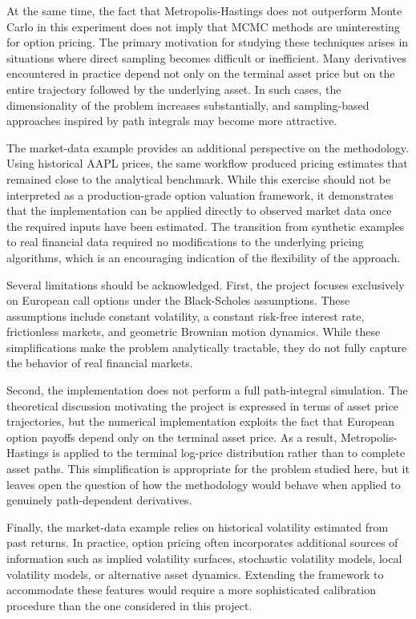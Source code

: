 \documentclass[
  12pt,
  letterpaper,
]{book}
\begin{document}
At the same time, the fact that Metropolis-Hastings does not outperform
Monte Carlo in this experiment does not imply that MCMC methods are
uninteresting for option pricing. The primary motivation for studying
these techniques arises in situations where direct sampling becomes
difficult or inefficient. Many derivatives encountered in practice
depend not only on the terminal asset price but on the entire trajectory
followed by the underlying asset. In such cases, the dimensionality of
the problem increases substantially, and sampling-based approaches
inspired by path integrals may become more attractive.

The market-data example provides an additional perspective on the
methodology. Using historical AAPL prices, the same workflow produced
pricing estimates that remained close to the analytical benchmark. While
this exercise should not be interpreted as a production-grade option
valuation framework, it demonstrates that the implementation can be
applied directly to observed market data once the required inputs have
been estimated. The transition from synthetic examples to real financial
data required no modifications to the underlying pricing algorithms,
which is an encouraging indication of the flexibility of the approach.

Several limitations should be acknowledged. First, the project focuses
exclusively on European call options under the Black-Scholes
assumptions. These assumptions include constant volatility, a constant
risk-free interest rate, frictionless markets, and geometric Brownian
motion dynamics. While these simplifications make the problem
analytically tractable, they do not fully capture the behavior of real
financial markets.

Second, the implementation does not perform a full path-integral
simulation. The theoretical discussion motivating the project is
expressed in terms of asset price trajectories, but the numerical
implementation exploits the fact that European option payoffs depend
only on the terminal asset price. As a result, Metropolis-Hastings is
applied to the terminal log-price distribution rather than to complete
asset paths. This simplification is appropriate for the problem studied
here, but it leaves open the question of how the methodology would
behave when applied to genuinely path-dependent derivatives.

Finally, the market-data example relies on historical volatility
estimated from past returns. In practice, option pricing often
incorporates additional sources of information such as implied
volatility surfaces, stochastic volatility models, local volatility
models, or alternative asset dynamics. Extending the framework to
accommodate these features would require a more sophisticated
calibration procedure than the one considered in this project.
\end{document}
